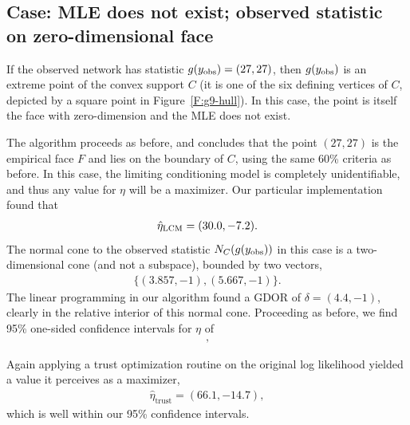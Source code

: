\subsection{Case: MLE does not exist; observed statistic on zero-dimensional face}
If the observed network has statistic $g(y_{\text{obs}}) = (27, 27)$,  then 
$g(y_{\text{obs}})$ is an extreme point
of the convex support $C$ (it is one of the six defining vertices of $C$, depicted by
a square point in Figure~\ref{F:g9-hull}).  In this case, the point is itself the 
face with zero-dimension and the MLE does not exist.  

The algorithm proceeds as before, and concludes that the 
point $(27,27)$ is the empirical face $F$ and lies on the boundary of $C$, using the
same 60\% criteria as before.
In this case, the limiting conditioning model is completely unidentifiable, and thus 
any value for $\eta$ will be a maximizer.  Our particular implementation found that
\begin{align*}
	\hat{\eta}_{\textrm{LCM}} = (30.0, -7.2 ).
\end{align*}
The normal cone to the observed statistic $N_C (g(y_{\text{obs}}) )$ in this case is a two-dimensional cone (and not a subspace), bounded by 
two vectors,
\begin{align*}
	 \{ (3.857,   -1),	(5.667,   -1) \}.
\end{align*}
The linear programming in our algorithm found a GDOR of $\delta = (4.4, -1)$, clearly 
in the relative interior of this normal cone.
Proceeding as before, we find 95\% one-sided confidence intervals for $\eta$ of 
\begin{align*}
	[14.4, +\infty)\\
	(-\infty, -3.7],
\end{align*}


Again applying a trust optimization routine on the original log 
likelihood yielded a value it perceives as a maximizer,  
\begin{align*}
 	\hat{\eta}_{\textrm{trust}} = (66.1, -14.7),
 \end{align*}
which is well within our 95\% confidence intervals.
  

